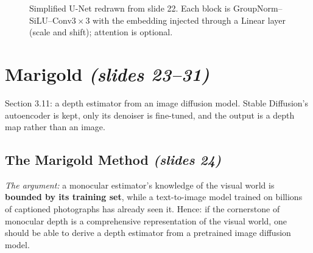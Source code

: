 \documentclass[11pt,a4paper]{article}
\numberwithin{equation}{section}
\newcommand{\slides}[1]{\texorpdfstring{\;\emph{(slides #1)}}{ (slides #1)}}
\theoremstyle{plain}
\theoremstyle{definition}
\begin{document}
\begin{figure}[H]
\centering
{}
\caption{Simplified U-Net redrawn from slide 22. Each block is GroupNorm--SiLU--Conv$3{\times}3$ with the embedding injected through a Linear layer (scale and shift); attention is optional.}
\end{figure}

\section{Marigold \slides{23--31}}\label{sec:marigold}
Section 3.11: a depth estimator from an image diffusion model. Stable Diffusion's autoencoder is kept, only its denoiser is fine-tuned, and the output is a depth map rather than an image.

\subsection{The Marigold Method \slides{24}}
\emph{The argument:} a monocular estimator's knowledge of the visual world is \textbf{bounded by its training set}, while a text-to-image model trained on billions of captioned photographs has already seen it. Hence: if the cornerstone of monocular depth is a comprehensive representation of the visual world, one should be able to derive a depth estimator from a pretrained image diffusion model.
\end{document}
